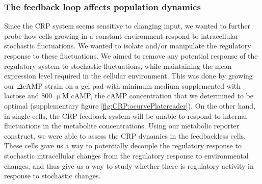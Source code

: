 \subsubsection{The feedback loop affects population dynamics}

Since the CRP system seems sensitive to changing input, we wanted to further probe how cells growing in a constant environment respond to intracellular stochastic fluctuations.
%
%
We wanted to isolate and/or manipulate the regulatory response to these fluctuations.
%
We aimed to remove any potential response of the regulatory system to stochastic fluctuations, while maintaining the mean expression level 
required in the cellular environment.
%
This was done by growing our $\Delta$cAMP strain on a gel pad with minimum medium supplemented with lactose and 800 $\upmu$M cAMP,
the cAMP concentration that we determined to be optimal (supplementary figure \ref{fig:CRP:ocurvePlatereader}).
%
On the other hand, 
in single cells,
the CRP feedback system will be unable to respond to internal fluctuations in the metabolite concentrations.
%
%
Using our metabolic reporter construct, we were able to assess the CRP dynamics in the feedbackless cells.
%
These cells gave us a way to potentially 
decouple the regulatory response to stochastic intracellular changes from the regulatory response to environmental changes,
and thus give us a way to study whether there is regulatory activity in response to stochastic changes.




